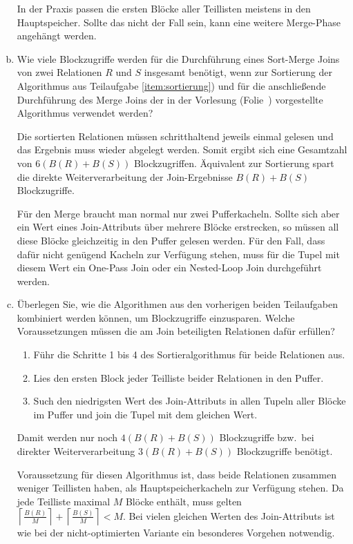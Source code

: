 \begin{enumerate}[a)]
\begin{solution}
		In der Praxis passen die ersten Blöcke aller Teillisten meistens in den Hauptspeicher.
		Sollte das nicht der Fall sein, kann eine weitere Merge-Phase angehängt werden.
	\end{solution}

\item Wie viele Blockzugriffe werden für die Durchführung eines Sort-Merge Joins von zwei Relationen \(R\) und \(S\) insgesamt benötigt, wenn zur Sortierung der Algorithmus aus Teilaufgabe \ref{item:sortierung}) und für die anschließende Durchführung des Merge Joins der in der Vorlesung (Folie~\MergeJoin) vorgestellte Algorithmus verwendet werden?

	\begin{solution}
		Die sortierten Relationen müssen schritthaltend jeweils einmal gelesen und das Ergebnis muss wieder abgelegt werden.
		Somit ergibt sich eine Gesamtzahl von \(6 (B(R) + B(S))\) Blockzugriffen.
		Äquivalent zur Sortierung spart die direkte Weiterverarbeitung der Join-Ergebnisse \(B(R) + B(S)\) Blockzugriffe.

		Für den Merge braucht man normal nur zwei Pufferkacheln.
		Sollte sich aber ein Wert eines Join-Attributs über mehrere Blöcke erstrecken, so müssen all diese Blöcke gleichzeitig in den Puffer gelesen werden.
		Für den Fall, dass dafür nicht genügend Kacheln zur Verfügung stehen, muss für die Tupel mit diesem Wert ein One-Pass Join oder ein Nested-Loop Join durchgeführt werden.
	\end{solution}

\item \label{item:kombiniert}Überlegen Sie, wie die Algorithmen aus den vorherigen beiden Teilaufgaben kombiniert werden können, um Blockzugriffe einzusparen.
	Welche Voraussetzungen müssen die am Join beteiligten Relationen dafür erfüllen?

	\begin{solution}
		\begin{enumerate}[1.]
		\item Führ die Schritte 1 bis 4 des Sortieralgorithmus für beide Relationen aus.
		\item	Lies den ersten Block jeder Teilliste beider Relationen in den Puffer.
		\item Such den niedrigsten Wert des Join-Attributs in allen Tupeln aller Blöcke im Puffer und join die Tupel mit dem gleichen Wert.
		\end{enumerate}

		Damit werden nur noch \(4 (B(R) + B(S))\) Blockzugriffe bzw.\ bei direkter Weiterverarbeitung \(3 (B(R) + B(S))\) Blockzugriffe benötigt.

		Voraussetzung für diesen Algorithmus ist, dass beide Relationen zusammen weniger Teillisten haben, als Hauptspeicherkacheln zur Verfügung stehen.
		Da jede Teilliste maximal \(M\) Blöcke enthält, muss gelten \( \left \lceil \frac{B(R)}{M} \right \rceil + \left \lceil \frac{B(S)}{M} \right \rceil < M\).
		Bei vielen gleichen Werten des Join-Attributs ist wie bei der nicht-optimierten Variante ein besonderes Vorgehen notwendig.
	\end{solution}
\end{enumerate}
